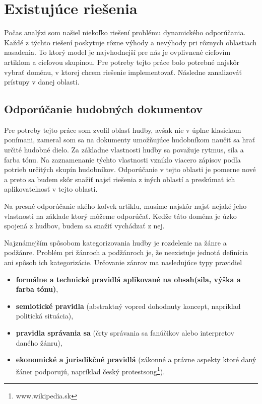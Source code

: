 \newpage

\section{Existujúce riešenia}

Počas analýzi som našiel niekoľko riešení problému dynamického odporúčania.
Každé z týchto riešení poskytuje rôzne výhody a nevýhody pri rôznych oblastiach
nasadenia. To ktorý model je najvhodnejší pre nás je ovplivnené cieľovím artiklom
a cieľovou skupinou. Pre potreby tejto práce bolo potrebné najskôr vybrať doménu,
v ktorej chcem riešenie implementovať. Následne zanalizováť prístupy v danej oblasti.

\subsection{Odporúčanie hudobných dokumentov}

Pre potreby tejto práce som zvolil oblasť hudby, avšak nie v úplne klasickom ponímani,
zameral som sa na dokumenty umožňujúce hudobníkom naučiť sa hrať určité hudobné dielo.
Za základne vlastnosti hudby sa považuje rytmus, sila a farba tónu.
Na zaznamenanie týchto vlastnosti vzniklo viacero zápisov podľa potrieb
určitých skupín hudobníkov. Odporúčanie v tejto oblasti je pomerne nové 
a preto sa budem skôr snažiť najsť riešenia z iných oblastí a preskúmať
ich aplikovateľnosť v tejto oblasti.

Na presné odporúčanie akého koľvek artiklu, musíme najskôr najsť nejaké jeho
vlastnosti na základe ktorý môžeme odporúčať. Keďže táto doména je úzko spojená z hudbov,
budem sa snažiť vychádzať z nej.

Najznámejším spôsobom kategorizovania hudby je rozdelenie na žánre a podžánre.
Problém pri žánroch a podžánroch je, že neexistuje jednotá definícia ani spôsob
ich kategorizácie. Určovanie zánrov ma nasledujúce typy pravidiel

\begin{itemize}
\item{\textbf{formálne a technické pravidlá aplikované na obsah(sila, výška a farba tónu)},}
\item{\textbf{semiotické pravidla} (abstraktný vopred dohodnuty koncept,
    napríklad politická situácia),}
\item{\textbf{pravidla správania sa} 
    (črty správania sa fanúčikov alebo interpretov daného žánru),}
\item{\textbf{ekonomické a jurisdikčné pravidlá} 
    (zákonné a právne aspekty ktoré daný žáner podporujú,
        napríklad český protestsong\footnote[1]{www.wikipedia.sk}).}
\end{itemize}

